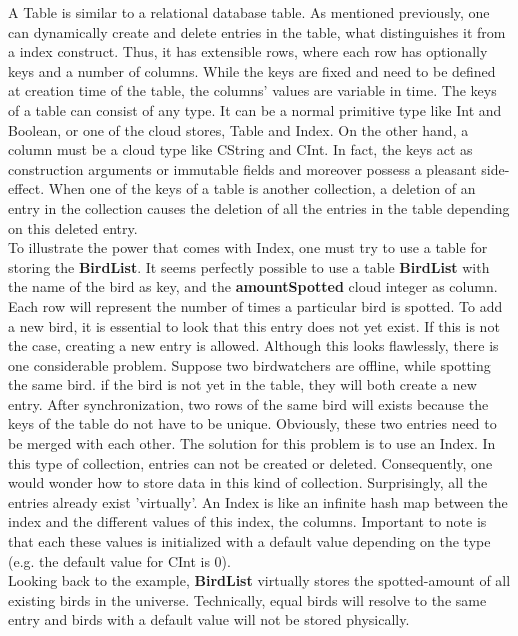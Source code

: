 \documentclass[a4paper,12pt]{report}
\begin{document}
A \textcolor{codeblue}{Table} is similar to a relational database table. As mentioned previously, one can dynamically create and delete entries in the table, what distinguishes it from a index construct. Thus, it has extensible rows, where each row has optionally keys and a number of columns. While the keys are fixed and need to be defined at creation time of the table, the columns' values are variable in time. The keys of a table can consist of any type. It can be a normal primitive type like \textcolor{codedarkblue}{Int} and \textcolor{codedarkblue}{Boolean}, or one of the cloud stores, \textcolor{codeblue}{Table} and \textcolor{codeblue}{Index}. On the other hand, a column must be a cloud type like \textcolor{codedarkblue}{CString} and \textcolor{codedarkblue}{CInt}. In fact, the keys act as construction arguments or immutable fields and moreover possess a pleasant side-effect. When one of the keys of a table is another collection, a deletion of an entry in the collection causes the deletion of all the entries in the table depending on this deleted entry. \\

To illustrate the power that comes with \textcolor{codeblue}{Index}, one must try to use a table for storing the \textbf{BirdList}. It seems perfectly possible to use a table \textbf{BirdList} with the name of the bird as key, and the \textbf{amountSpotted} cloud integer as column. Each row will represent the number of times a particular bird is spotted. To add a new bird, it is essential to look that this entry does not yet exist. If this is not the case, creating a new entry is allowed. Although this looks flawlessly, there is one considerable problem. Suppose two birdwatchers are offline, while spotting the same bird. if the bird is not yet in the table, they will both create a new entry. After synchronization, two rows of the same bird will exists because the keys of the table do not have to be unique. Obviously, these two entries need to be merged with each other. The solution for this problem is to use an \textcolor{codeblue}{Index}. In this type of collection, entries can not be created or deleted. Consequently, one would wonder how to store data in this kind of collection. Surprisingly, all the entries already exist 'virtually'. An \textcolor{codeblue}{Index} is like an infinite hash map between the index and the different values of this index, the columns. Important to note is that each these values is initialized with a default value depending on the type (e.g. the default value for \textcolor{codedarkblue}{CInt} is 0). \\
Looking back to the example, \textbf{BirdList} virtually stores the spotted-amount of all existing birds in the universe. Technically, equal birds will resolve to the same entry and birds with a default value will not be stored physically. \\
\end{document}
